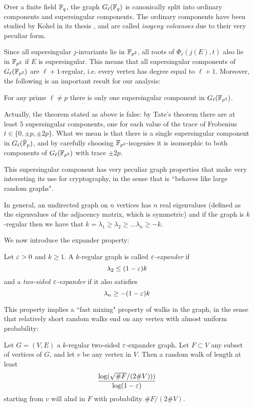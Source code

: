 Over a finite field $\mathbb{F}_q$, the graph $G_\ell(\mathbb{F}_q)$ is canonically split into ordinary components and supersingular components. The ordinary components have been studied by Kohel in its thesis \cite{Kohel_thesis}, and are called \emph{isogeny volcanoes} due to their very peculiar form.

Since all supersingular $j$-invariants lie in $\mathbb{F}_{p^2}$, all roots of $\Phi_\ell(j(E),t)$ also lie in $\mathbb{F}_{p^2}$ if $E$ is supersingular. This means that all supersingular components of $G_\ell(\mathbb{F}_{p^2})$ are $\ell+1$-regular, i.e. every vertex has degree equal to $\ell+1$. Moreover, the following is an important result for our analysis:
\begin{theorem}
    For any prime $\ell\neq p$ there is only one supersingular component in $G_\ell(\mathbb{F}_{p^2})$.
\end{theorem}
Actually, the theorem stated as above is false: by Tate's theorem there are at least $5$ supersingular components, one for each value of the trace of Frobenius $t\in\{0,\pm p,\pm 2p\}$. What we mean is that there is a single supersingular component in $G_\ell(\bar{\mathbb{F}}_p)$, and by carefully choosing $\mathbb{F}_{p^2}$-isogenies it is isomorphic to both components of $G_\ell(\mathbb{F}_{p^2})$ with trace $\pm 2p$.

This supersingular component has very peculiar graph properties that make very interesting its use for cryptography, in the sense that is ``behaves like large random graphs".

In general, an undirected graph on $n$ vertices has $n$ real eigenvalues (defined as the eigenvalues of the adjacency matrix, which is symmetric) and if the graph is $k$-regular then we have that $k=\lambda_1\ge\lambda_2\ge\dots \lambda_n\ge -k$.

We now introduce the expander property:
\begin{definition}
    Let $\varepsilon>0$ and $k\ge1$. A $k$-regular graph is called \emph{$\varepsilon$-expander} if
    $$\lambda_2\le(1-\varepsilon)k$$
    and a \emph{two-sided $\varepsilon$-expander} if it also satisfies 
    $$\lambda_n\ge-(1-\varepsilon)k$$
\end{definition}

This property implies a ``fast mixing" property of walks in the graph, in the sense that relatively short random walks end on any vertex with almost uniform probability:
\begin{proposition}
    Let $G=(V,E)$ a $k$-regular two-sided $\varepsilon$-expander graph. Let $F\subset V$ any subset of vertices of $G$, and let $v$ be any vertex in $V$. Then a random walk of length at least $$\frac{\log(\sqrt{\# F}/(2\# V)))}{\log(1-\varepsilon)}$$ starting from $v$ will alnd in $F$ with probability $\# F / (2\# V)$.
\end{proposition}


